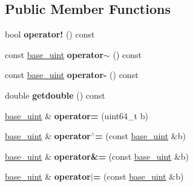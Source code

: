 \subsection*{Public Member Functions}
\begin{DoxyCompactItemize}
\item 
\mbox{\label{classbase__uint_afbcdb1cf849d37272b4e7d4fabf1192b}} 
bool {\bfseries operator!} () const
\item 
\mbox{\label{classbase__uint_a2803d039b33d5570f47ac39d797bc9ea}} 
const \mbox{\hyperlink{classbase__uint}{base\+\_\+uint}} {\bfseries operator$\sim$} () const
\item 
\mbox{\label{classbase__uint_a3b758876b828c6faffdc2a2880122595}} 
const \mbox{\hyperlink{classbase__uint}{base\+\_\+uint}} {\bfseries operator-\/} () const
\item 
\mbox{\label{classbase__uint_ac989d44cd0d60e6c510722a714b817fa}} 
double {\bfseries getdouble} () const
\item 
\mbox{\label{classbase__uint_a115a5ddb2f2637e09703a25cfc580483}} 
\mbox{\hyperlink{classbase__uint}{base\+\_\+uint}} \& {\bfseries operator=} (uint64\+\_\+t b)
\item 
\mbox{\label{classbase__uint_ad5ec10977ebeab115fe857637990e267}} 
\mbox{\hyperlink{classbase__uint}{base\+\_\+uint}} \& {\bfseries operator$^\wedge$=} (const \mbox{\hyperlink{classbase__uint}{base\+\_\+uint}} \&b)
\item 
\mbox{\label{classbase__uint_a6cb549b322e5bbcca794366f5fd3fb15}} 
\mbox{\hyperlink{classbase__uint}{base\+\_\+uint}} \& {\bfseries operator\&=} (const \mbox{\hyperlink{classbase__uint}{base\+\_\+uint}} \&b)
\item 
\mbox{\label{classbase__uint_ab116d89cbae68b32fbecf5d1de98bb2e}} 
\mbox{\hyperlink{classbase__uint}{base\+\_\+uint}} \& {\bfseries operator$\vert$=} (const \mbox{\hyperlink{classbase__uint}{base\+\_\+uint}} \&b)
\item 
\mbox{\label{classbase__uint_a3d77324f5c5166e4dabadac360bea6e7}} 

\end{DoxyCompactItemize}
